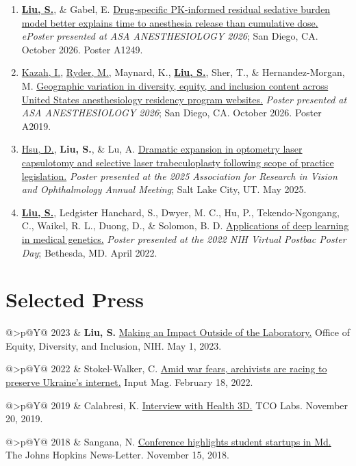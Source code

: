\documentclass[10pt,letterpaper]{article}
\makeatletter
\newlength{\datewidth}
\newcommand{\cventry}[2]{%
  \Needspace{2\baselineskip}%
  \begin{tabularx}{\textwidth}{@{}>{\raggedleft\arraybackslash\small}p{\datewidth}@{\hspace{0.16in}}Y@{}}%
    #1 & #2%
  \end{tabularx}\par\vspace{0.12em}%
}
\newcommand{\cvsection}[1]{%
  \Needspace{7\baselineskip}%
  \section*{#1}%
}
\newcommand{\publication}[2][]{%
  \Needspace{2\baselineskip}%
  \item[#1] {\interlinepenalty=10000 #2\par}%
}
\makeatother
\begin{document}
\begin{enumerate}[leftmargin=2.7em,labelsep=0.6em]

\publication[P-4]{\underline{\textbf{Liu, S.}}, \& Gabel, E. \href{https://simonliu.dev/cv/files/liu\_residual\_sedative\_burden.pdf}{Drug-specific PK-informed residual sedative burden model better explains time to anesthesia release than cumulative dose.} \emph{ePoster presented at ASA ANESTHESIOLOGY 2026}; San Diego, CA. October 2026. Poster A1249.}
\publication[P-3]{\underline{Kazah, I.}, \underline{Ryder, M.}, Maynard, K., \underline{\textbf{Liu, S.}}, Sher, T., \& Hernandez-Morgan, M. \href{https://simonliu.dev/cv/files/liu\_dei\_residency\_websites.pdf}{Geographic variation in diversity, equity, and inclusion content across United States anesthesiology residency program websites.} \emph{Poster presented at ASA ANESTHESIOLOGY 2026}; San Diego, CA. October 2026. Poster A2019.}
\publication[P-2]{\underline{Hsu, D.}, \textbf{Liu, S.}, \& Lu, A. \href{https://simonliu.dev/cv/files/liu\_expansion\_following\_legislation.pdf}{Dramatic expansion in optometry laser capsulotomy and selective laser trabeculoplasty following scope of practice legislation.} \emph{Poster presented at the 2025 Association for Research in Vision and Ophthalmology Annual Meeting}; Salt Lake City, UT. May 2025.}
\publication[P-1]{\underline{\textbf{Liu, S.}}, Ledgister Hanchard, S., Dwyer, M. C., Hu, P., Tekendo-Ngongang, C., Waikel, R. L., Duong, D., \& Solomon, B. D. \href{https://simonliu.dev/cv/files/liu\_applications\_of\_dl\_poster.pdf}{Applications of deep learning in medical genetics.} \emph{Poster presented at the 2022 NIH Virtual Postbac Poster Day}; Bethesda, MD. April 2022.}
\end{enumerate}

\cvsection{Selected Press}

\cventry{2023}{\textbf{Liu, S.} \href{http://web.archive.org/web/20241221035123/https://edi.nih.gov/the-EDI-pulse-blog/making-impact-outside-laboratory}{Making an Impact Outside of the Laboratory.} Office of Equity, Diversity, and Inclusion, NIH. May 1, 2023.}

\cventry{2022}{Stokel-Walker, C. \href{https://www.inputmag.com/culture/archiveteam-warrior-ukraine-websites-internet-russia-cyberattacks}{Amid war fears, archivists are racing to preserve Ukraine's internet.} Input Mag. February 18, 2022.}

\cventry{2019}{Calabresi, K. \href{https://medium.com/tco-labs-blog/health3d-interview-a933be08cfc4}{Interview with Health 3D.} TCO Labs. November 20, 2019.}

\cventry{2018}{Sangana, N. \href{https://www.jhunewsletter.com/article/2018/11/conference-highlights-student-startups-in-md}{Conference highlights student startups in Md.} The Johns Hopkins News-Letter. November 15, 2018.}
\end{document}
